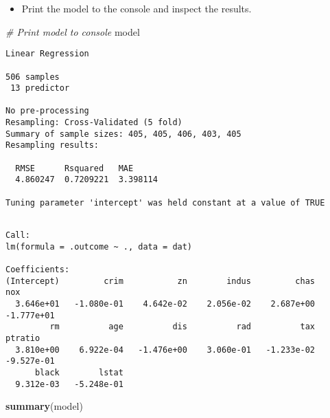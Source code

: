 \documentclass[
]{book}
\newenvironment{Shaded}{\begin{snugshade}}{\end{snugshade}}
\newcommand{\CommentTok}[1]{\textcolor[rgb]{0.56,0.35,0.01}{\textit{#1}}}
\newcommand{\KeywordTok}[1]{\textcolor[rgb]{0.13,0.29,0.53}{\textbf{#1}}}
\newcommand{\NormalTok}[1]{#1}
\newcommand{\OperatorTok}[1]{\textcolor[rgb]{0.81,0.36,0.00}{\textbf{#1}}}
\providecommand{\tightlist}{%
  \setlength{\itemsep}{0pt}\setlength{\parskip}{0pt}}
\begin{document}
\begin{itemize}
\tightlist
\item
  Print the model to the console and inspect the results.
\end{itemize}

\begin{Shaded}
\begin{Highlighting}[]
\CommentTok{# Print model to console}
\NormalTok{model}
\end{Highlighting}
\end{Shaded}

\begin{verbatim}
Linear Regression 

506 samples
 13 predictor

No pre-processing
Resampling: Cross-Validated (5 fold) 
Summary of sample sizes: 405, 405, 406, 403, 405 
Resampling results:

  RMSE      Rsquared   MAE     
  4.860247  0.7209221  3.398114

Tuning parameter 'intercept' was held constant at a value of TRUE
\end{verbatim}

\begin{Shaded}
\end{Shaded}

\begin{verbatim}

Call:
lm(formula = .outcome ~ ., data = dat)

Coefficients:
(Intercept)         crim           zn        indus         chas          nox  
  3.646e+01   -1.080e-01    4.642e-02    2.056e-02    2.687e+00   -1.777e+01  
         rm          age          dis          rad          tax      ptratio  
  3.810e+00    6.922e-04   -1.476e+00    3.060e-01   -1.233e-02   -9.527e-01  
      black        lstat  
  9.312e-03   -5.248e-01  
\end{verbatim}

\begin{Shaded}
\begin{Highlighting}[]
\KeywordTok{summary}\NormalTok{(model)}
\end{Highlighting}
\end{Shaded}
\end{document}
